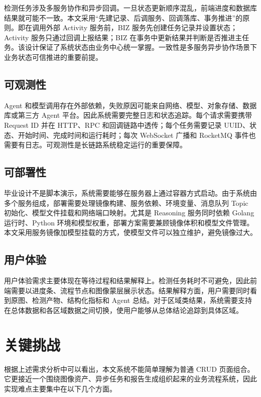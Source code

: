 检测任务涉及多服务协作和异步回调。一旦状态更新顺序混乱，前端进度和数据库结果就可能不一致。本文采用“先建记录、后调服务、回调落库、事务推进”的原则。即在调用外部 Activity 服务前，BIZ 服务先创建任务记录并设置状态；Activity 服务只通过回调上报结果；BIZ 在事务中更新结果并判断是否推进主任务。该设计保证了系统状态由业务中心统一掌握。一致性是多服务异步协作场景下业务状态可信推进的重要前提。

\subsection{可观测性}
\label{subsec:requirements-observability}

Agent 和模型调用存在外部依赖，失败原因可能来自网络、模型、对象存储、数据库或第三方 Agent 平台。因此系统需要完整日志和状态追踪。每个请求需要携带 Request ID 并在 HTTP、RPC 和回调链路中透传；每个任务需要记录 UUID、状态、开始时间、完成时间和运行耗时；每次 WebSocket 广播和 RocketMQ 事件也需要有日志。可观测性是长链路系统稳定运行的重要保障。

\subsection{可部署性}
\label{subsec:requirements-deployability}

毕业设计不是脚本演示，系统需要能够在服务器上通过容器方式启动。由于系统由多个服务组成，部署需要处理镜像构建、服务依赖、环境变量、消息队列 Topic 初始化、模型文件挂载和网络端口映射。尤其是 Reasoning 服务同时依赖 Golang 运行时、Python 环境和模型权重，部署方案需要兼顾镜像体积和模型文件管理。本文采用服务镜像加模型挂载的方式，使模型文件可以独立维护，避免镜像过大。

\subsection{用户体验}
\label{subsec:requirements-user-experience}

用户体验需求主要体现在等待过程和结果解释上。检测任务耗时不可避免，因此前端需要以进度条、流程节点和图像蒙层展示状态。结果解释方面，用户需要同时看到原图、检测产物、结构化指标和 Agent 总结。对于区域类结果，系统需要支持在总体数据和各区域数据之间切换，使用户能够从总体结论追踪到具体区域。

\section{关键挑战}
\label{sec:requirements-key-challenges}

根据上述需求分析中可以看出，本文系统不能简单理解为普通 CRUD 页面组合。它更接近一个围绕图像资产、异步任务和报告生成组织起来的业务流程系统，因此实现难点主要集中在以下几个方面。

